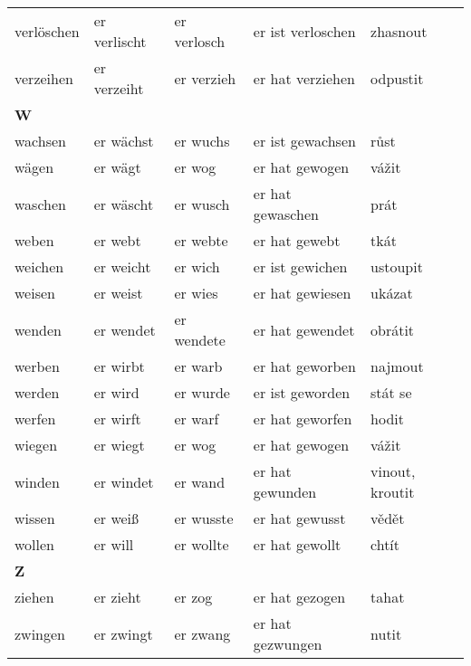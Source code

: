 \documentclass[a4paper,12pt]{report}
\begin{document}
\begin{longtable}{ | m{2cm} | m{2.5cm} | m{2.5cm} | m{4cm} | m{3cm} | }
    verlöschen  & er verlischt  & er verlosch  & er ist verloschen  & zhasnout           \\
    verzeihen   & er verzeiht   & er verzieh   & er hat verziehen   & odpustit           \\
    \hline
    \textbf{W}  &               &              &                    &                    \\
    wachsen     & er wächst     & er wuchs     & er ist gewachsen   & růst               \\
    wägen       & er wägt       & er wog       & er hat gewogen     & vážit              \\
    waschen     & er wäscht     & er wusch     & er hat gewaschen   & prát               \\
    weben       & er webt       & er webte     & er hat gewebt      & tkát               \\
    weichen     & er weicht     & er wich      & er ist gewichen    & ustoupit           \\
    weisen      & er weist      & er wies      & er hat gewiesen    & ukázat             \\
    wenden      & er wendet     & er wendete   & er hat gewendet    & obrátit            \\
    werben      & er wirbt      & er warb      & er hat geworben    & najmout            \\
    werden      & er wird       & er wurde     & er ist geworden    & stát se            \\
    werfen      & er wirft      & er warf      & er hat geworfen    & hodit              \\
    wiegen      & er wiegt      & er wog       & er hat gewogen     & vážit              \\
    winden      & er windet     & er wand      & er hat gewunden    & vinout, kroutit    \\
    wissen      & er weiß       & er wusste    & er hat gewusst     & vědět              \\
    wollen      & er will       & er wollte    & er hat gewollt     & chtít              \\
    \hline
    \textbf{Z}  &               &              &                    &                    \\
    ziehen      & er zieht      & er zog       & er hat gezogen     & tahat              \\
    zwingen     & er zwingt     & er zwang     & er hat gezwungen   & nutit              \\
    \hline
  \end{longtable}
\end{document}
